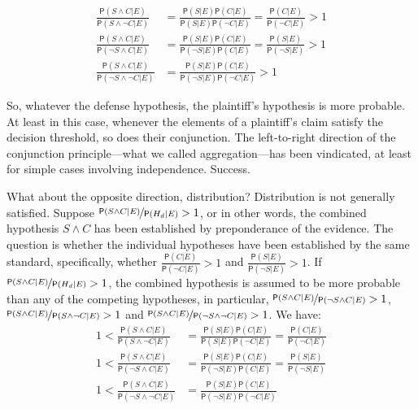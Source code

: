 \documentclass[
  10pt,
  dvipsnames,enabledeprecatedfontcommands]{scrartcl}
\newcommand{\n}{\neg}
\newcommand{\et}{\wedge}
\newcommand{\pr}[1]{\ensuremath{\mathsf{P}(#1)}}
\begin{document}
\begin{align}\label{eq:cheng-multiplication}
\frac{\pr{S\et C\vert E}}{\pr{S\et \n C\vert E}} & = \frac{\pr{S\vert E}\pr{C\vert E}}{\pr{S \vert E}\pr{\n C \vert E}}  =\frac{\pr{C\vert E}}{\pr{\n C \vert E}} > 1 \\
\nonumber
\frac{\pr{S\et C\vert E}}{\pr{\n S\et C\vert E}} & = \frac{\pr{S\vert E}\pr{C\vert E}}{\pr{\n S \vert E}\pr{C\vert E}}  = \frac{\pr{S\vert E}}{\pr{\n S \vert E}} > 1 \\
\nonumber
\frac{\pr{S\et C\vert E}}{\pr{\n S\et \n C\vert E}} & = \frac{\pr{S\vert E}\pr{C\vert E}}{\pr{\n S \vert E}\pr{\n C \vert E}}   > 1 
\end{align}

\noindent So, whatever the defense hypothesis, the plaintiff's
hypothesis is more probable. At least in this case, whenever the
elements of a plaintiff's claim satisfy the decision threshold, so does
their conjunction. The left-to-right direction of the conjunction
principle---what we called aggregation---has been vindicated, at least
for simple cases involving independence. Success.

What about the opposite direction, distribution? Distribution is not
generally satisfied. Suppose
\(\nicefrac{\pr{S\et C\vert E}}{\pr{H_d \vert E}}>1\), or in other
words, the combined hypothesis \(S \et C\) has been established by
preponderance of the evidence. The question is whether the individual
hypotheses have been established by the same standard, specifically,
whether \(\frac{\pr{C\vert E}}{\pr{\n C \vert E}} > 1\) and
\(\frac{\pr{S\vert E}}{\pr{\n S \vert E}} > 1\). If
\(\nicefrac{\pr{S\et C\vert E}}{\pr{H_d \vert E}}>1\), the combined
hypothesis is assumed to be more probable than any of the competing
hypotheses, in particular,
\(\nicefrac{\pr{S\et C\vert E}}{\pr{\neg S \et C \vert E}}>1\),
\(\nicefrac{\pr{S\et C\vert E}}{\pr{S \et \neg C \vert E}}>1\) and
\(\nicefrac{\pr{S\et C\vert E}}{\pr{\neg S \et \neg C \vert E}}>1\). We
have: \begin{align}\label{eq:cheng-multiplication-two}
1 < \frac{\pr{S\et C\vert E}}{\pr{S\et \n C\vert E}} & = \frac{\pr{S\vert E}\pr{C\vert E}}{\pr{S \vert E}\pr{\n C \vert E}}  =\frac{\pr{C\vert E}}{\pr{\n C \vert E}} \\
\nonumber
1 < \frac{\pr{S\et C\vert E}}{\pr{\n S\et C\vert E}} & = \frac{\pr{S\vert E}\pr{C\vert E}}{\pr{\n S \vert E}\pr{C\vert E}}  = \frac{\pr{S\vert E}}{\pr{\n S \vert E}}  \\
\nonumber
1 < \frac{\pr{S\et C\vert E}}{\pr{\n S\et \n C\vert E}} & = \frac{\pr{S\vert E}\pr{C\vert E}}{\pr{\n S \vert E}\pr{\n C \vert E}}   
\end{align}
\end{document}
